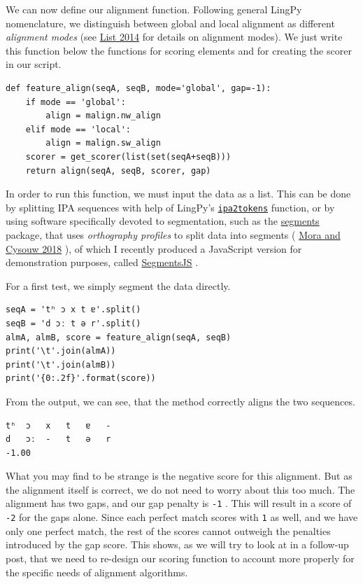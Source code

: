 \documentclass[
  a4paper,
  14pt,
  oneside,
  tablecaptionabove
]{scrbook}
\newcommand{\passthrough}[1]{#1}
\begin{document}
We can now define our alignment function. Following general LingPy
nomenclature, we distinguish between global and local alignment as
different \emph{alignment modes} (see
\href{http://bibliography.lingpy.org?key=List2014d}{List 2014} for
details on alignment modes). We just write this function below the
functions for scoring elements and for creating the scorer in our
script.

\begin{lstlisting}
def feature_align(seqA, seqB, mode='global', gap=-1):
    if mode == 'global':
        align = malign.nw_align
    elif mode == 'local':
        align = malign.sw_align
    scorer = get_scorer(list(set(seqA+seqB)))
    return align(seqA, seqB, scorer, gap)
\end{lstlisting}

In order to run this function, we must input the data as a list. This
can be done by splitting IPA sequences with help of LingPy's
\href{http://lingpy.org/reference/lingpy.sequence.html\#lingpy.sequence.sound_classes.ipa2tokens}{\passthrough{\lstinline!ipa2tokens!}}
function, or by using software specifically devoted to segmentation,
such as the \href{https://github.com/cldf/segments}{segments} package,
that uses \emph{orthography profiles} to split data into segments (
\href{http://bibliography.lingpy.org?key=Moran2018}{Mora and Cysouw
2018} ), of which I recently produced a JavaScript version for
demonstration purposes, called
\href{http://calc.digling.org/profile/}{SegmentsJS} .

For a first test, we simply segment the data directly.

\begin{lstlisting}
seqA = 'tʰ ɔ x t ɐ'.split()
seqB = 'd ɔː t ə r'.split()
almA, almB, score = feature_align(seqA, seqB)
print('\t'.join(almA))
print('\t'.join(almB))
print('{0:.2f}'.format(score))
\end{lstlisting}

From the output, we can see, that the method correctly aligns the two
sequences.

\begin{lstlisting}
tʰ  ɔ   x   t   ɐ   -
d   ɔː  -   t   ə   r
-1.00
\end{lstlisting}

What you may find to be strange is the negative score for this
alignment. But as the alignment itself is correct, we do not need to
worry about this too much. The alignment has two gaps, and our gap
penalty is \passthrough{\lstinline!-1!} . This will result in a score of
\passthrough{\lstinline!-2!} for the gaps alone. Since each perfect
match scores with \passthrough{\lstinline!1!} as well, and we have only
one perfect match, the rest of the scores cannot outweigh the penalties
introduced by the gap score. This shows, as we will try to look at in a
follow-up post, that we need to re-design our scoring function to
account more properly for the specific needs of alignment algorithms.
\end{document}
